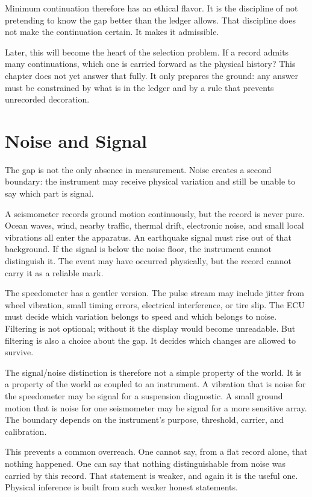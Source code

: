 Minimum continuation therefore has an ethical flavor. It is the discipline of
not pretending to know the gap better than the ledger allows. That discipline
does not make the continuation certain. It makes it admissible.

Later, this will become the heart of the selection problem. If a record admits
many continuations, which one is carried forward as the physical history? This
chapter does not yet answer that fully. It only prepares the ground: any answer
must be constrained by what is in the ledger and by a rule that prevents
unrecorded decoration.

\section{Noise and Signal}
\label{se:noise-and-signal}

The gap is not the only absence in measurement. Noise creates a second boundary:
the instrument may receive physical variation and still be unable to say which
part is signal.

A seismometer records ground motion continuously, but the record is never pure.
Ocean waves, wind, nearby traffic, thermal drift, electronic noise, and small
local vibrations all enter the apparatus. An earthquake signal must rise out of
that background. If the signal is below the noise floor, the instrument cannot
distinguish it. The event may have occurred physically, but the record cannot
carry it as a reliable mark.

The speedometer has a gentler version. The pulse stream may include jitter from
wheel vibration, small timing errors, electrical interference, or tire slip. The
ECU must decide which variation belongs to speed and which belongs to noise.
Filtering is not optional; without it the display would become unreadable. But
filtering is also a choice about the gap. It decides which changes are allowed
to survive.

The signal/noise distinction is therefore not a simple property of the world. It
is a property of the world as coupled to an instrument. A vibration that is noise
for the speedometer may be signal for a suspension diagnostic. A small ground
motion that is noise for one seismometer may be signal for a more sensitive
array. The boundary depends on the instrument's purpose, threshold, carrier, and
calibration.

This prevents a common overreach. One cannot say, from a flat record alone,
that nothing happened. One can say that nothing distinguishable from noise was
carried by this record. That statement is weaker, and again it is the useful
one. Physical inference is built from such weaker honest statements.

